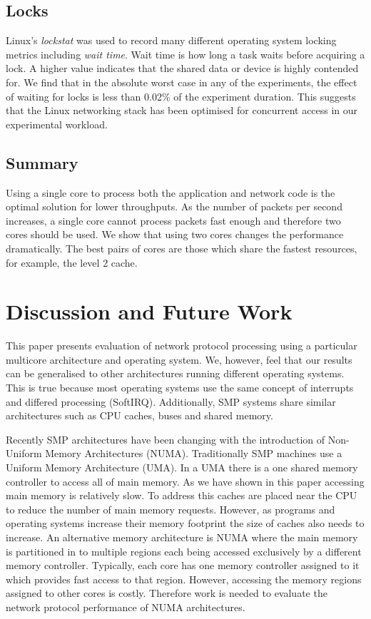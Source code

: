 \documentclass[conference, compsoc]{IEEEtran}
\begin{document}
\subsection{Locks}
\label{sect:locks}

Linux's \emph{lockstat} was used to record many different operating system locking metrics including \emph{wait time}.  Wait time is how long a task waits before acquiring a lock. A higher value indicates that the shared data or device is highly contended for. We find that in the absolute worst case in any of the experiments, the effect of waiting for locks is less than 0.02\% of the experiment duration. This suggests that the Linux networking stack has been optimised for concurrent access in our experimental workload.

\subsection{Summary}
\label{sect:sum}
Using a single core to process both the application and network code is the optimal solution for lower throughputs. As the number of packets per second increases, a single core cannot process packets fast enough and therefore two cores should be used. We show that using two cores changes the performance dramatically. The best pairs of cores are those which share the fastest resources, for example, the level 2 cache.

\section{Discussion and Future Work}
\label{sect:future_work}
This paper presents evaluation of network protocol processing using a particular multicore architecture and operating system. We, however, feel that our results can be generalised to other architectures running different operating systems. This is true because most operating systems use the same concept of interrupts and differed processing (SoftIRQ). Additionally, SMP systems share similar architectures such as CPU caches, buses and shared memory.

Recently SMP architectures have been changing with the introduction of Non-Uniform Memory Architectures (NUMA). Traditionally SMP machines use a Uniform Memory Architecture (UMA). In a UMA there is a one shared memory controller to access all of main memory. As we have shown in this paper accessing main memory is relatively slow. To address this caches are placed near the CPU to reduce the number of main memory requests. However, as programs and operating systems increase their memory footprint the size of caches also needs to increase. An alternative memory architecture is NUMA where the main memory is partitioned in to multiple regions each being accessed exclusively by a different memory controller. Typically, each core has one memory controller assigned to it which provides fast access to that region. However, accessing the memory regions assigned to other cores is costly. Therefore work is needed to evaluate the network protocol performance of NUMA architectures.
\end{document}
